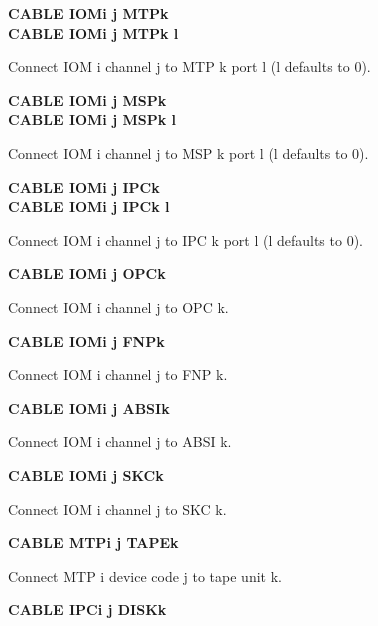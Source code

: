 \textbf{CABLE IOMi j MTPk} \\
\textbf{CABLE IOMi j MTPk l}

\begin{adjustwidth}{5ex}{1ex}
  Connect IOM i channel j to MTP k port l (l defaults to 0).
\end{adjustwidth}  

\textbf{CABLE IOMi j MSPk} \\
\textbf{CABLE IOMi j MSPk l}

\begin{adjustwidth}{5ex}{1ex}
  Connect IOM i channel j to MSP k port l (l defaults to 0).
\end{adjustwidth}  

\textbf{CABLE IOMi j IPCk} \\
\textbf{CABLE IOMi j IPCk l} \\

\begin{adjustwidth}{5ex}{1ex}
  Connect IOM i channel j to IPC k port l (l defaults to 0).
\end{adjustwidth}  

\textbf{CABLE IOMi j OPCk}

\begin{adjustwidth}{5ex}{1ex}
  Connect IOM i channel j to OPC k.
\end{adjustwidth}  

\textbf{CABLE IOMi j FNPk}

\begin{adjustwidth}{5ex}{1ex}
  Connect IOM i channel j to FNP k.
\end{adjustwidth}  

\textbf{CABLE IOMi j ABSIk}

\begin{adjustwidth}{5ex}{1ex}
  Connect IOM i channel j to ABSI k.
\end{adjustwidth}  

\textbf{CABLE IOMi j SKCk}

\begin{adjustwidth}{5ex}{1ex}
  Connect IOM i channel j to SKC k.
\end{adjustwidth}  

\textbf{CABLE MTPi j TAPEk}

\begin{adjustwidth}{5ex}{1ex}
  Connect MTP i device code j to tape unit k.
\end{adjustwidth}  

\textbf{CABLE IPCi j DISKk}

